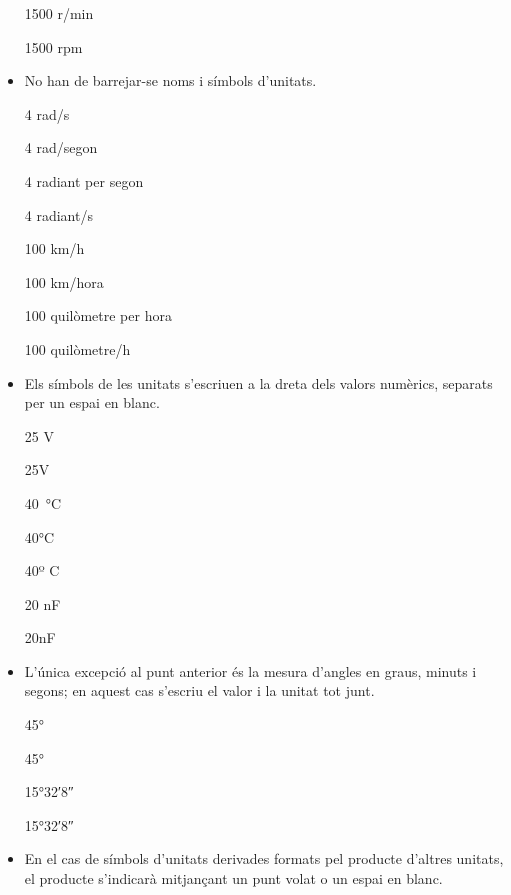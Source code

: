 \begin{itemize}
\textcolor{Green}\faCheckSquare{} 1500 r/min

\textcolor{Red}\faTimesCircle{} 1500 rpm

\item No han de barrejar-se noms i símbols d'unitats.

\textcolor{Green}\faCheckSquare{} 4 rad/s

\textcolor{Red}\faTimesCircle{} 4 rad/segon

\textcolor{Green}\faCheckSquare{} 4 radiant per segon

\textcolor{Red}\faTimesCircle{} 4 radiant/s

\textcolor{Green}\faCheckSquare{} 100 km/h

\textcolor{Red}\faTimesCircle{} 100 km/hora

\textcolor{Green}\faCheckSquare{} 100 quilòmetre per hora

\textcolor{Red}\faTimesCircle{} 100 quilòmetre/h


\item Els símbols de les unitats s'escriuen a la dreta dels valors
numèrics, separats per un espai en blanc.

\textcolor{Green}\faCheckSquare{} 25 V

\textcolor{Red}\faTimesCircle{} 25V

\textcolor{Green}\faCheckSquare{} \qty{40}{\degreeCelsius}

\textcolor{Red}\faTimesCircle{} 40\unit{\degreeCelsius}

\textcolor{Red}\faTimesCircle{} 40º C

\textcolor{Green}\faCheckSquare{} 20 nF

\textcolor{Red}\faTimesCircle{} 20nF


\item  L'única excepció al punt anterior és la mesura d'angles en graus, minuts i segons; en aquest cas s'escriu el valor i la unitat tot junt.

\textcolor{Green}\faCheckSquare{} \ang{45}

\textcolor{Red}\faTimesCircle{} \ang[number-angle-product = \,]{45}

\textcolor{Green}\faCheckSquare{} \ang{15;32;8}

\textcolor{Red}\faTimesCircle{} \ang[number-angle-product = \,]{15;32;8}

\item En el cas de símbols d'unitats derivades formats pel producte
d'altres unitats, el producte s'indicarà mitjançant un punt volat o
un espai en blanc.


\end{itemize}
